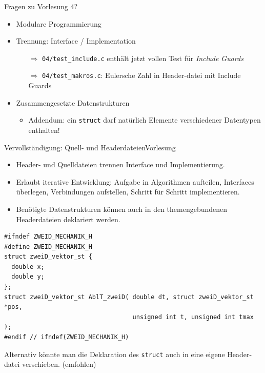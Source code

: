 \documentclass[xcolor=dvipsnames]{beamer}
\newcounter{lecturecounter}
\begin{document}
\begin{frame}[fragile]{Fragen zu Vorlesung 4?}
  \begin{itemize}
    \item{Modulare Programmierung}
    \item{Trennung: Interface / Implementation }
    \begin{itemize}
      \item[$\Rightarrow$]{\verb|04/test_include.c| enthält jetzt vollen Test für \emph{Include Guards}}
      \item[$\Rightarrow$]{\verb|04/test_makros.c|: Eulersche Zahl in Header-datei mit Include Guards}
    \end{itemize}
    \vspace{0.3cm}
    \item{Zusammengesetzte Datenstrukturen}
    \begin{itemize}
      \item{Addendum: ein \texttt{struct} darf natürlich Elemente verschiedener Datentypen enthalten!}
    \end{itemize}
  \end{itemize}
\end{frame}

\begin{frame}[fragile]{Vervollständigung: Quell- und Headerdateien}{Vorlesung }
  \begin{block}{}
    \small
    \begin{itemize}
      \item{Header- und Quelldateien trennen Interface und Implementierung.}
      \item{Erlaubt iterative Entwicklung: Aufgabe in Algorithmen aufteilen, Interfaces überlegen, Verbindungen aufstellen, Schritt für Schritt implementieren.}
      \item{Benötigte Datenstrukturen können auch in den themengebundenen Headerdateien deklariert werden.}
    \end{itemize}
  \end{block}
\begin{lstlisting}[basicstyle=\ttfamily\scriptsize]
#ifndef ZWEID_MECHANIK_H
#define ZWEID_MECHANIK_H
struct zweiD_vektor_st {
  double x;
  double y;
};
struct zweiD_vektor_st AblT_zweiD( double dt, struct zweiD_vektor_st *pos,
                                   unsigned int t, unsigned int tmax );
#endif // ifndef(ZWEID_MECHANIK_H)
\end{lstlisting}
\vspace{-0.2cm}
\begin{block}{}
  Alternativ könnte man die Deklaration des \verb|struct| auch in eine eigene Header-datei verschieben. (emfohlen)
\end{block}
\end{frame}
\end{document}

